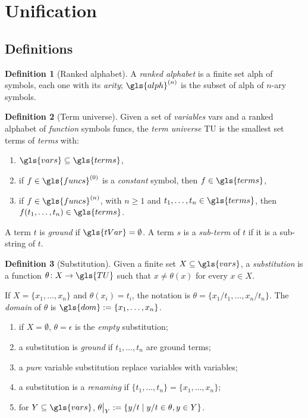 \documentclass{report}
\theoremstyle{definition}
\newtheorem{dfn}{Definition}[section]
\theoremstyle{plain}
\theoremstyle{remark}
\newcommand\restr[2]{{%
  \left.\kern-\nulldelimiterspace %
  #1 %
  \vphantom{\big|} %
  \right|_{#2} %
}}
\begin{document}
\section{Unification}

\subsection{Definitions}

\begin{dfn}[Ranked alphabet]
  A \emph{ranked alphabet} is a finite set \gls{alph} of symbols, each one with its \emph{arity}; \(\gls{alph}^{(n)}\) is the subset of \gls{alph} of \(n\)-ary symbols.
\end{dfn}

\begin{dfn}[Term universe]
  Given a set of \emph{variables} \gls{vars} and a ranked alphabet of \emph{function} symbols \gls{funcs}, the \emph{term universe} \gls{TU} is the smallest set \gls{terms} of \emph{terms} with:
  \begin{enumerate}
      \item \(\gls{vars} \subseteq \gls{terms}\),
      \item if \(f \in \gls{funcs}^{(0)}\) is a \emph{constant} symbol, then \(f \in \gls{terms}\),
      \item if \(f \in \gls{funcs}^{(n)}\), with \(n \ge 1\) and \(t_1,\dotsc,t_n \in \gls{terms}\), then \(f(t_1,\dotsc,t_n) \in \gls{terms}\).
  \end{enumerate}
  A term \(t\) is \emph{ground} if \(\gls{tVar} = \emptyset\).
  A term \(s\) is a \emph{sub-term} of \(t\) if it is a sub-string of \(t\).
\end{dfn}

\begin{dfn}[Substitution]
    Given a finite set \(X \subseteq \gls{vars}\), a \emph{substitution} is a function \(\theta \colon X \to \gls{TU}\) such that \(x \ne \theta(x)\) for every \(x \in X\).

    If \(X = \lbrace x_1,\dotsc,x_n \rbrace\) and \(\theta(x_i) = t_i\), the notation is \(\theta = \lbrace x_1/t_1,\dotsc,x_n/t_n \rbrace\).
    The \emph{domain} of \(\theta\) is \(\gls{dom} := \lbrace x_1,\dotsc,x_n \rbrace\).
    \begin{enumerate}
        \item if \(X = \emptyset\), \(\theta = \epsilon\) is the \emph{empty} substitution;
        \item a substitution is \emph{ground} if \(t_1,\dotsc,t_n\) are ground terms;
        \item a \emph{pure} variable substitution replace variables with variables;
        \item a substitution is a \emph{renaming} if \(\lbrace t_1,\dotsc,t_n \rbrace = \lbrace x_1,\dotsc,x_n \rbrace\);
        \item for \(Y \subseteq \gls{vars}\), \(\restr{\theta}{Y} := \lbrace y/t \mid y/t \in \theta, y \in Y \rbrace \).
    \end{enumerate} 
\end{dfn}
\end{document}
